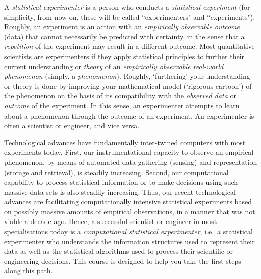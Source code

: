 \documentclass[a4paper]{letter}
\begin{document}
\begin{letter}{}
A {\it statistical experimenter} is a person who conducts a {\it statistical experiment} (for simplicity, from now on, these will be called ``experimenters" and ``experiments").  Roughly, an experiment is an action with an {\it empirically observable outcome} (data) that cannot necessarily be predicted with certainty, in the sense that a {\it repetition} of the experiment may result in a different outcome.  Most quantitative scientists are experimenters if they apply statistical principles to further their current understanding or {\it theory} of an {\it empirically observable real-world phenomenon} (simply, a {\it phenomenon}).  Roughly, `furthering' your understanding or theory is done by improving your mathematical model (\lq rigorous cartoon\rq) of the phenomenon on the basis of its compatibility with the {\it observed data} or {\it outcome} of the experiment.  In this sense, an experimenter attempts to learn about a phenomenon through the outcome of an experiment.  An experimenter is often a scientist or engineer, and vice versa.

Technological advances have fundamentally inter-twined computers with most experiments today.  First, our instrumentational capacity to observe an empirical phenomenon, by means of automated data gathering (sensing) and representation (storage and retrieval), is steadily increasing.  Second, our computational capability to process statistical information or to make decisions using such massive data-sets is also steadily increasing.  Thus, our recent technological advances are facilitating computationally intensive statistical experiments based on possibly massive amounts of empirical observations, in a manner that was not viable a decade ago.  Hence, a successful scientist or engineer in most specialisations today is a {\it computational statistical experimenter}, i.e.~a statistical experimenter who understands the information structures used to represent their data as well as the statistical algorithms used to process their scientific or engineering decisions.  This course is designed to help you take the first steps along this path.


\end{letter}
\end{document}
